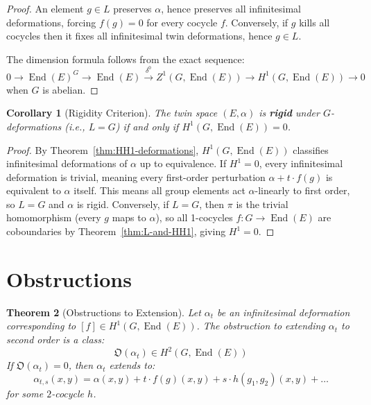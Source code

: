 \documentclass[11pt,a4paper,openany]{book}
\theoremstyle{plain}
\newtheorem{theorem}{Theorem}[chapter]
\newtheorem{corollary}[theorem]{Corollary}
\theoremstyle{definition}
\newcommand{\lingroup}{L}
\newcommand{\actspace}{E}
\newcommand{\groupG}{G}
\DeclareMathOperator{\End}{End}
\begin{document}
\begin{proof}
An element $g \in \lingroup$ preserves $\alpha$, hence preserves all infinitesimal deformations, forcing $f(g) = 0$ for every cocycle $f$. Conversely, if $g$ kills all cocycles then it fixes all infinitesimal twin deformations, hence $g \in \lingroup$.

The dimension formula follows from the exact sequence:
\[
0 \to \End(\actspace)^\groupG \to \End(\actspace) \xrightarrow{\delta^0} Z^1(\groupG, \End(\actspace)) \to H^1(\groupG, \End(\actspace)) \to 0
\]
when $\groupG$ is abelian.
\end{proof}

\begin{corollary}[Rigidity Criterion]\label{cor:rigidity}
The twin space $(\actspace, \alpha)$ is \textbf{rigid} under $\groupG$-deformations (i.e., $\lingroup = \groupG$) if and only if $H^1(\groupG, \End(\actspace)) = 0$.
\end{corollary}

\begin{proof}
By Theorem~\ref{thm:HH1-deformations}, $H^1(\groupG, \End(\actspace))$ classifies infinitesimal deformations of $\alpha$ up to equivalence. If $H^1 = 0$, every infinitesimal deformation is trivial, meaning every first-order perturbation $\alpha + t \cdot f(g)$ is equivalent to $\alpha$ itself. This means all group elements act $\alpha$-linearly to first order, so $\lingroup = \groupG$ and $\alpha$ is rigid. Conversely, if $\lingroup = \groupG$, then $\pi$ is the trivial homomorphism (every $g$ maps to $\alpha$), so all 1-cocycles $f : \groupG \to \End(\actspace)$ are coboundaries by Theorem~\ref{thm:L-and-HH1}, giving $H^1 = 0$.
\end{proof}

\section{Obstructions}

\begin{theorem}[Obstructions to Extension]\label{thm:obstructions}
Let $\alpha_t$ be an infinitesimal deformation corresponding to $[f] \in H^1(\groupG, \End(\actspace))$. The obstruction to extending $\alpha_t$ to second order is a class:
\[
\mathfrak{O}(\alpha_t) \in H^2(\groupG, \End(\actspace))
\]
If $\mathfrak{O}(\alpha_t) = 0$, then $\alpha_t$ extends to:
\[
\alpha_{t,s}(x, y) = \alpha(x, y) + t \cdot f(g)(x, y) + s \cdot h(g_1, g_2)(x, y) + \ldots
\]
for some $2$-cocycle $h$.
\end{theorem}
\end{document}
